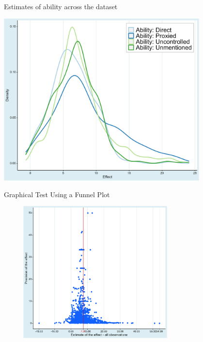 \documentclass{beamer} %
\begin{document}
\begin{frame}{Estimates of ability across the dataset}

    \begin{center}
        \includegraphics[width=0.8\textwidth]{Figures/prima_facie_ability.png}
    \end{center}

\end{frame}



\begin{frame}{Graphical Test Using a Funnel Plot}
    \begin{figure}[htbp]
        \begin{center}
            \includegraphics[width=0.7\textwidth]{Figures/funnel.png}
        \end{center}
    \end{figure}
\end{frame}
\end{document}
